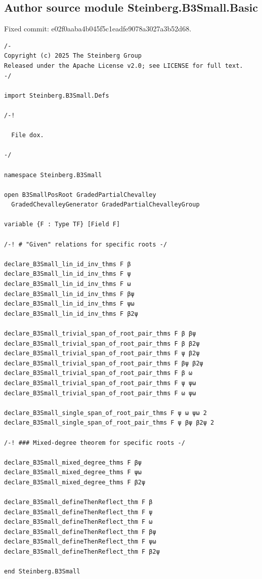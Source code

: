\documentclass[10pt,a4paper]{article}
\begin{document}
\subsection*{Author source module Steinberg.B3Small.Basic}
\noindent Fixed commit: e02f0aaba4b045f5c1eadfe9078a3027a3b52d68.
\begin{Verbatim}
/-
Copyright (c) 2025 The Steinberg Group
Released under the Apache License v2.0; see LICENSE for full text.
-/

import Steinberg.B3Small.Defs

/-!

  File dox.

-/

namespace Steinberg.B3Small

open B3SmallPosRoot GradedPartialChevalley
  GradedChevalleyGenerator GradedPartialChevalleyGroup

variable {F : Type TF} [Field F]

/-! # "Given" relations for specific roots -/

declare_B3Small_lin_id_inv_thms F β
declare_B3Small_lin_id_inv_thms F ψ
declare_B3Small_lin_id_inv_thms F ω
declare_B3Small_lin_id_inv_thms F βψ
declare_B3Small_lin_id_inv_thms F ψω
declare_B3Small_lin_id_inv_thms F β2ψ

declare_B3Small_trivial_span_of_root_pair_thms F β βψ
declare_B3Small_trivial_span_of_root_pair_thms F β β2ψ
declare_B3Small_trivial_span_of_root_pair_thms F ψ β2ψ
declare_B3Small_trivial_span_of_root_pair_thms F βψ β2ψ
declare_B3Small_trivial_span_of_root_pair_thms F β ω
declare_B3Small_trivial_span_of_root_pair_thms F ψ ψω
declare_B3Small_trivial_span_of_root_pair_thms F ω ψω

declare_B3Small_single_span_of_root_pair_thms F ψ ω ψω 2
declare_B3Small_single_span_of_root_pair_thms F ψ βψ β2ψ 2

/-! ### Mixed-degree theorem for specific roots -/

declare_B3Small_mixed_degree_thms F βψ
declare_B3Small_mixed_degree_thms F ψω
declare_B3Small_mixed_degree_thms F β2ψ

declare_B3Small_defineThenReflect_thm F β
declare_B3Small_defineThenReflect_thm F ψ
declare_B3Small_defineThenReflect_thm F ω
declare_B3Small_defineThenReflect_thm F βψ
declare_B3Small_defineThenReflect_thm F ψω
declare_B3Small_defineThenReflect_thm F β2ψ

end Steinberg.B3Small
\end{Verbatim}
\end{document}
